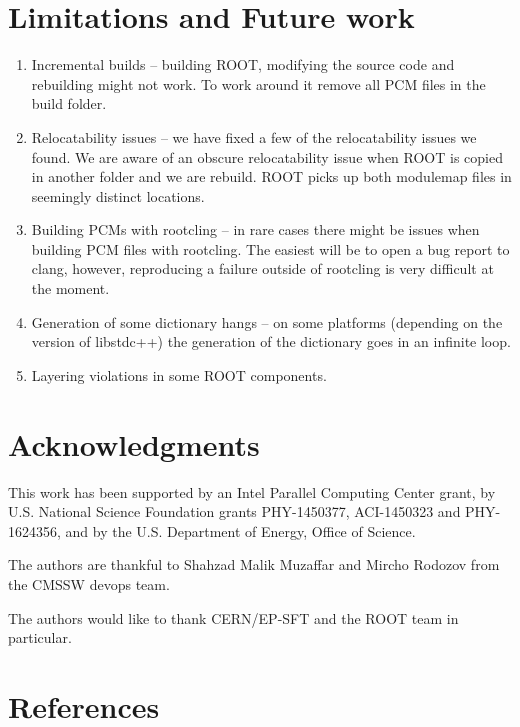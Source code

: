\documentclass[12pt]{iopart}
\begin{document}
\section{Limitations and Future work}
\begin{enumerate}
    \item Incremental builds -- building ROOT, modifying the source code and rebuilding might not work. To work around it remove all PCM files in the build folder.
    \item Relocatability issues -- we have fixed a few of the relocatability issues we found. We are aware of an obscure relocatability issue when ROOT is copied in another folder and we are rebuild. ROOT picks up both modulemap files in seemingly distinct locations.
    \item Building PCMs with rootcling -- in rare cases there might be issues when building PCM files with rootcling. The easiest will be to open a bug report to clang, however, reproducing a failure outside of rootcling is very difficult at the moment.
    \item Generation of some dictionary hangs -- on some platforms (depending on the version of libstdc++) the generation of the dictionary goes in an infinite loop. 
    \item Layering violations in some ROOT components.
\end{enumerate}


\section{Acknowledgments}
\label{ack}

This work has been supported by an Intel Parallel Computing Center grant, by U.S. National Science Foundation grants PHY-1450377, ACI-1450323 and PHY-1624356, and by the U.S. Department of Energy, Office of Science.

The authors are thankful to Shahzad Malik Muzaffar and Mircho Rodozov from the CMSSW devops team.

The authors would like to thank CERN/EP-SFT and the ROOT team in particular.


\section*{References}
\end{document}
